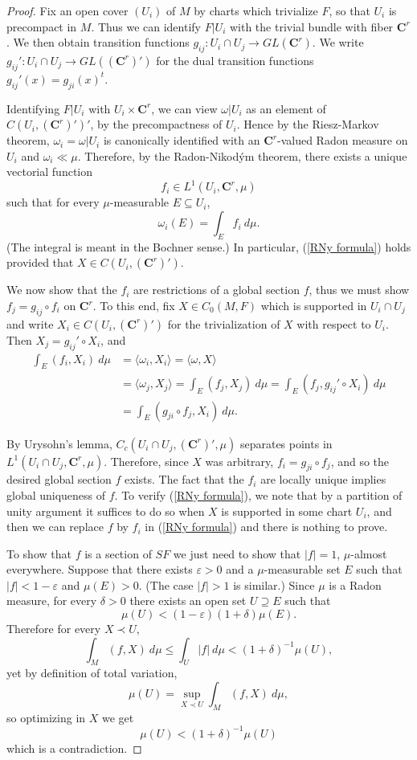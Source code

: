 \documentclass[reqno,12pt,letterpaper]{amsart}
\newcommand{\CC}{\mathbf{C}}
\theoremstyle{definition}
\numberwithin{equation}{section}
\begin{document}
\begin{proof}
Fix an open cover $(U_i)$ of $M$ by charts which trivialize $F$, so that $U_i$ is precompact in $M$.
Thus we can identify $F|U_i$ with the trivial bundle with fiber $\CC^r$.
We then obtain transition functions $g_{ij}: U_i \cap U_j \to GL(\CC^r)$.
We write $g_{ij}': U_i \cap U_j \to GL((\CC^r)')$ for the dual transition functions $g_{ij}'(x) = g_{ji}(x)^t$.

Identifying $F|U_i$ with $U_i \times \CC^r$, we can view $\omega|U_i$ as an element of $C(U_i, (\CC^r)')'$, by the precompactness of $U_i$.
Hence by the Riesz-Markov theorem, $\omega_i = \omega|U_i$ is canonically identified with an $\CC^r$-valued Radon measure on $U_i$ and $\omega_i \ll \mu$.
Therefore, by the Radon-Nikod\'ym theorem, there exists a unique vectorial function
$$f_i \in L^1(U_i, \CC^r, \mu)$$
such that for every $\mu$-measurable $E \subseteq U_i$,
$$\omega_i(E) = \int_E f_i ~d\mu.$$
(The integral is meant in the Bochner sense.)
In particular, (\ref{RNy formula}) holds provided that $X \in C(U_i, (\CC^r)')$.

We now show that the $f_i$ are restrictions of a global section $f$, thus we must show $f_j = g_{ij} \circ f_i$ on $\CC^r$.
To this end, fix $X \in C_0(M, F)$ which is supported in $U_i \cap U_j$ and write $X_i \in C(U_i, (\CC^r)')$ for the trivialization of $X$ with respect to $U_i$.
Then $X_j = g_{ij}' \circ X_i$, and
\begin{align*}
\int_E (f_i, X_i) ~d\mu &= \langle \omega_i, X_i\rangle = \langle \omega, X\rangle\\
&= \langle \omega_j, X_j\rangle = \int_E (f_j, X_j) ~d\mu = \int_E (f_j, g_{ij}' \circ X_i) ~d\mu \\
&= \int_E (g_{ji} \circ f_j, X_i) ~d\mu.
\end{align*}

By Urysohn's lemma, $C_c(U_i \cap U_j, (\CC^r)', \mu)$ separates points in $L^1(U_i \cap U_j, \CC^r, \mu)$.
Therefore, since $X$ was arbitrary, $f_i = g_{ji} \circ f_j$, and so the desired global section $f$ exists.
The fact that the $f_i$ are locally unique implies global uniqueness of $f$.
To verify (\ref{RNy formula}), we note that by a partition of unity argument it suffices to do so when $X$ is supported in some chart $U_i$, and then we can replace $f$ by $f_i$ in (\ref{RNy formula}) and there is nothing to prove.

To show that $f$ is a section of $SF$ we just need to show that $|f| = 1$, $\mu$-almost everywhere.
Suppose that there exists $\varepsilon > 0$ and a $\mu$-measurable set $E$ such that $|f| < 1 - \varepsilon$ and $\mu(E) > 0$. (The case $|f| > 1$ is similar.)
Since $\mu$ is a Radon measure, for every $\delta > 0$ there exists an open set $U \supseteq E$ such that
$$\mu(U) < (1 - \varepsilon)(1 + \delta)\mu(E).$$
Therefore for every $X \prec U$,
$$\int_M (f, X) ~d\mu \leq \int_U |f| ~d\mu < (1 + \delta)^{-1}\mu(U),$$
yet by definition of total variation,
$$\mu(U) = \sup_{X \prec U} \int_M (f, X) ~d\mu,$$
so optimizing in $X$ we get
$$\mu(U) < (1 + \delta)^{-1}\mu(U)$$
which is a contradiction.


\end{proof}
\end{document}
